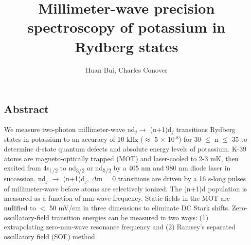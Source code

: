 \documentclass[landscape]{sciposter}
\title{Millimeter-wave precision spectroscopy of potassium in Rydberg states}
\author{Huan Bui, Charles Conover}
\institute{Department of Physics and Astronomy, Colby College, Waterville, Maine}
\begin{document}
\renewcommand{\titlesize}{\fontsize{60 pt}{75 pt}\selectfont}
\renewcommand{\authorsize}{\fontsize{38 pt}{45 pt}\selectfont}
\renewcommand{\instsize}{\fontsize{38 pt}{45 pt}\selectfont}
\maketitle

\fontsize{30 pt}{38 pt}\selectfont

\begin{multicols}{4}
\setlength{\columnseprule}{0pt}

\section*{\large Abstract}
{\normalfont We measure two-photon millimeter-wave nd$_j \to$ (n+1)d$_j$ transitions Rydberg states in potassium to an accuracy of 10 kHz ($\approx$ 5 $\times$ 10$^{\text{-8}}$) for 30 $\leq$ n $\leq$ 35 to determine d-state quantum defects and absolute energy levels of potassium. K-39 atoms are magneto-optically trapped (MOT) and laser-cooled to 2-3 mK, then excited from 4s\textsubscript{1/2} to nd\textsubscript{3/2} or nd\textsubscript{5/2} by a 405 nm and 980 nm diode laser in succession. nd$_j$ $\rightarrow$ (n+1)d$_j$, $\Delta$m = 0 transitions are driven by a 16 \textmu s-long pulses of millimeter-wave before atoms are selectively ionized. The (n+1)d population is measured as a function of mm-wave frequency. Static fields in the MOT are nullified to $<$ 50 mV/cm in three dimensions to eliminate DC Stark shifts. Zero-oscillatory-field transition energies can be measured in two ways: (1) extrapolating zero-mm-wave resonance frequency and (2) Ramsey's separated oscillatory field (SOF) method.}


\end{multicols}
\end{document}
